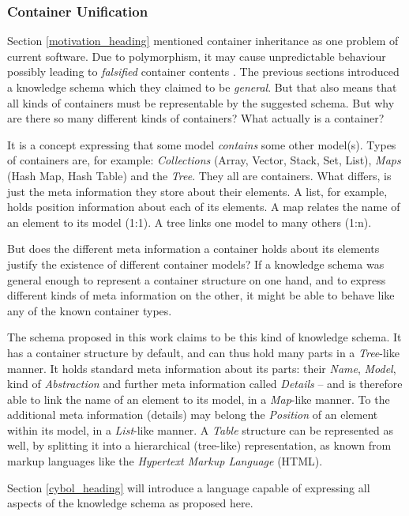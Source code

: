 %
%
%
%
%
%
%

\subsubsection{Container Unification}
\label{container_unification_heading}

Section \ref{motivation_heading} mentioned container inheritance as one problem
of current software. Due to polymorphism, it may cause unpredictable behaviour
possibly leading to \emph{falsified} container contents \cite{javaiaq}. The
previous sections introduced a knowledge schema which they claimed to be
\emph{general}. But that also means that all kinds of containers must be
representable by the suggested schema. But why are there so many different
kinds of containers? What actually is a container?

It is a concept expressing that some model \emph{contains} some other model(s).
Types of containers are, for example: \emph{Collections} (Array, Vector, Stack,
Set, List), \emph{Maps} (Hash Map, Hash Table) and the \emph{Tree}. They all
are containers. What differs, is just the meta information they store about
their elements. A list, for example, holds position information about each of
its elements. A map relates the name of an element to its model (1:1). A tree
links one model to many others (1:n).

But does the different meta information a container holds about its elements
justify the existence of different container models? If a knowledge schema was
general enough to represent a container structure on one hand, and to express
different kinds of meta information on the other, it might be able to behave
like any of the known container types.

The schema proposed in this work claims to be this kind of knowledge schema. It
has a container structure by default, and can thus hold many parts in a
\emph{Tree}-like manner. It holds standard meta information about its parts:
their \emph{Name}, \emph{Model}, kind of \emph{Abstraction} and further meta
information called \emph{Details} -- and is therefore able to link the name of
an element to its model, in a \emph{Map}-like manner. To the additional meta
information (details) may belong the \emph{Position} of an element within its
model, in a \emph{List}-like manner. A \emph{Table} structure can be represented
as well, by splitting it into a hierarchical (tree-like) representation, as
known from markup languages like the \emph{Hypertext Markup Language} (HTML).

Section \ref{cybol_heading} will introduce a language capable of expressing all
aspects of the knowledge schema as proposed here.
